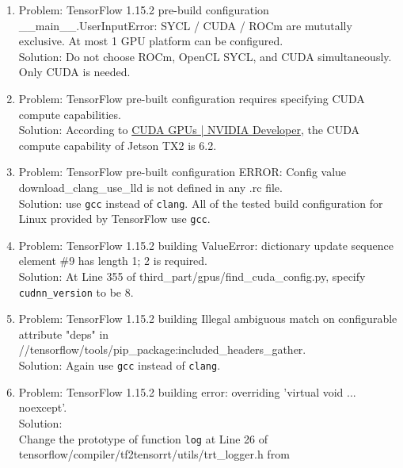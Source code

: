 \documentclass[a4paper]{article}
\begin{document}
\begin{enumerate}
\begin{verbatim}
sudo sed -i '\$a deb http://apt.llvm.org/bionic/ llvm-toolchain-bionic main\ndeb-src http://apt.llvm.org/bionic/ llvm-toolchain-bionic main' /etc/apt/sources.list
sudo apt-key adv --keyserver keyserver.ubuntu.com --recv-keys 15CF4D18AF4F7421
sudo apt update
sudo apt install clang-format clang-tidy clang-tools clang clangd libc++-dev libc++1 libc++abi-dev libc++abi1 libclang-dev libclang1 liblldb-dev libllvm-ocaml-dev libomp-dev libomp5 lld lldb llvm-dev llvm-runtime llvm python-clang
gunzip -c openmpi-4.1.1.tar.gz | tar xf -
cd openmpi-4.1.1
sudo ./configure --prefix=/usr/local
sudo make all install
        \end{verbatim}
    \item Problem: TensorFlow 1.15.2 pre-build configuration \_\_main\_\_.UserInputError: SYCL / CUDA / ROCm are mututally exclusive. At most 1 GPU platform can be configured.\\
    Solution: Do not choose ROCm, OpenCL SYCL, and CUDA simultaneously. Only CUDA is needed.
    \item Problem: TensorFlow pre-built configuration requires specifying CUDA compute capabilities.\\
    Solution: According to \href{https://developer.nvidia.com/cuda-gpus}{CUDA GPUs | NVIDIA Developer}, the CUDA compute capability of Jetson TX2 is 6.2.
    \item Problem: TensorFlow pre-built configuration ERROR: Config value download\_clang\_use\_lld is not defined in any .rc file.\\
    Solution: use \texttt{gcc} instead of \texttt{clang}. All of the tested build configuration for Linux provided by TensorFlow use \texttt{gcc}.
    \item Problem: TensorFlow 1.15.2 building ValueError: dictionary update sequence element \#9 has length 1; 2 is required.\\
    Solution: At Line 355 of third\_part/gpus/find\_cuda\_config.py, specify \texttt{cudnn\_version} to be 8.
    \item Problem: TensorFlow 1.15.2 building Illegal ambiguous match on configurable attribute "deps" in //tensorflow/tools/pip\_package:included\_headers\_gather.\\
    Solution: Again use \texttt{gcc} instead of \texttt{clang}.
    \item Problem: TensorFlow 1.15.2 building error: overriding 'virtual void ... noexcept'.\\
    Solution:\\
    Change the prototype of function \texttt{log} at Line 26 of tensorflow/compiler/tf2tensorrt/utils/trt\_logger.h from

\end{enumerate}
\end{document}

